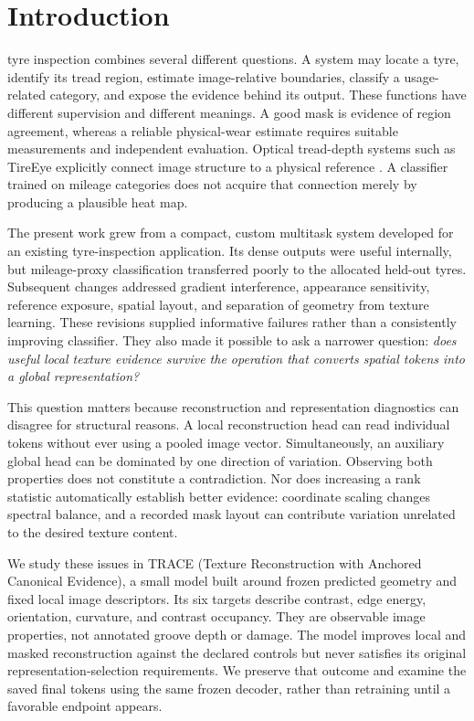 \section{Introduction}\label{sec:introduction}
 tyre inspection combines several different questions. A system may locate a tyre, identify its tread region, estimate image-relative boundaries, classify a usage-related category, and expose the evidence behind its output. These functions have different supervision and different meanings. A good mask is evidence of region agreement, whereas a reliable physical-wear estimate requires suitable measurements and independent evaluation. Optical tread-depth systems such as TireEye explicitly connect image structure to a physical reference \cite{tireeye}. A classifier trained on mileage categories does not acquire that connection merely by producing a plausible heat map.\AIdraftingnote

The present work grew from a compact, custom multitask system developed for an existing tyre-inspection application. Its dense outputs were useful internally, but mileage-proxy classification transferred poorly to the allocated held-out tyres. Subsequent changes addressed gradient interference, appearance sensitivity, reference exposure, spatial layout, and separation of geometry from texture learning. These revisions supplied informative failures rather than a consistently improving classifier. They also made it possible to ask a narrower question: \emph{does useful local texture evidence survive the operation that converts spatial tokens into a global representation?}

This question matters because reconstruction and representation diagnostics can disagree for structural reasons. A local reconstruction head can read individual tokens without ever using a pooled image vector. Simultaneously, an auxiliary global head can be dominated by one direction of variation. Observing both properties does not constitute a contradiction. Nor does increasing a rank statistic automatically establish better evidence: coordinate scaling changes spectral balance, and a recorded mask layout can contribute variation unrelated to the desired texture content.

We study these issues in TRACE (Texture Reconstruction with Anchored Canonical Evidence), a small model built around frozen predicted geometry and fixed local image descriptors. Its six targets describe contrast, edge energy, orientation, curvature, and contrast occupancy. They are observable image properties, not annotated groove depth or damage. The model improves local and masked reconstruction against the declared controls but never satisfies its original representation-selection requirements. We preserve that outcome and examine the saved final tokens using the same frozen decoder, rather than retraining until a favorable endpoint appears.

